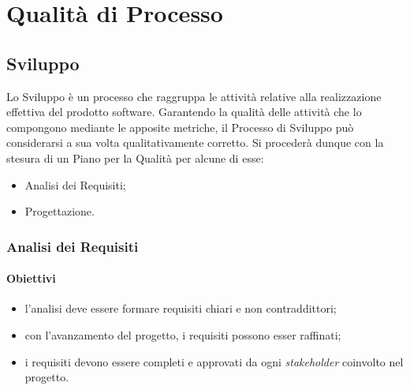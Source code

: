 \section{Qualità di Processo}
\subsection{Sviluppo}
Lo Sviluppo è un processo che raggruppa le attività relative alla realizzazione effettiva del prodotto software. Garantendo la qualità delle attività che lo compongono mediante le apposite metriche, il Processo di Sviluppo può considerarsi a sua volta qualitativamente corretto. Si procederà dunque con la stesura di un Piano per la Qualità per alcune di esse:
\begin{itemize}
	\item Analisi dei Requisiti;
	\item Progettazione.
\end{itemize}
\subsubsection{Analisi dei Requisiti}
\paragraph{Obiettivi}
\begin{itemize}
	\item l'analisi deve essere formare requisiti chiari e non contraddittori;
	\item con l'avanzamento del progetto, i requisiti possono esser raffinati;
	\item i requisiti devono essere completi e approvati da ogni \textit{stakeholder\glo} coinvolto nel progetto.
\end{itemize}
